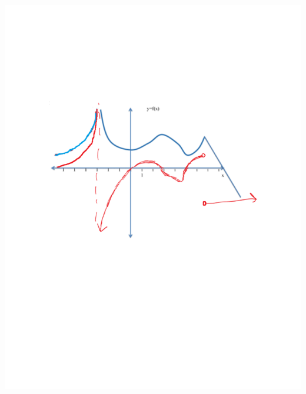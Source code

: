 \documentclass[nooutcomes]{ximera}
\begin{document}
\begin{problem}
\begin{freeResponse}
			\begin{image}
			\includegraphics[trim= 220 410 250 195]{Figure6.pdf}
			\end{image}
			
		\end{freeResponse}
		
\end{problem}
\end{document}
